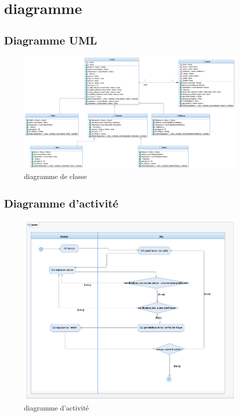 \newpage
\section{diagramme}
\subsection{Diagramme UML}
\begin{figure}[h]
	\centering
	\includegraphics[width=\textwidth] {pictures/uml.png}
	\caption{diagramme de classe}
	\label{fig:UML}
\end{figure}

\newpage
\subsection{Diagramme d'activité}
\begin{figure}[h]
	\centering
	\includegraphics[width=\textwidth] {pictures/dia_activite_jouer.png}
	\caption{diagramme d'activité}
	\label{fig:diagramme_activite}
\end{figure}